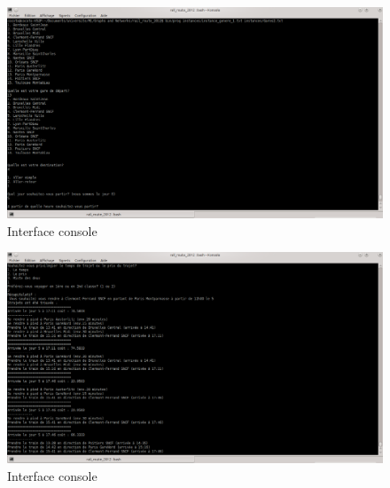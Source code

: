 \documentclass[a4paper,10pt,twoside]{report}
\begin{document}
 \begin{figure}[p]
    \centering
    \includegraphics[width=\textwidth]{screenshot4.png}
    \caption{Interface console}
    \label{screen1}
    \end{figure}
    
    \begin{figure}[p]
    \centering
    \includegraphics[width=\textwidth]{screenshot5.png}
    \caption{Interface console}
    \label{screen2}
    \end{figure}
    
\end{document}
